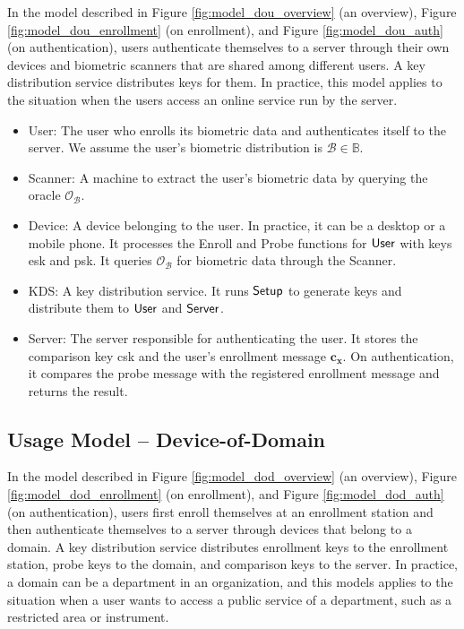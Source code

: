 In the model described in Figure \ref{fig:model_dou_overview} (an overview), Figure \ref{fig:model_dou_enrollment} (on enrollment), and Figure \ref{fig:model_dou_auth} (on authentication), users authenticate themselves to a server through their own devices and biometric scanners that are shared among different users.
A key distribution service distributes keys for them. In practice, this model applies to the situation when the users access an online service run by the server.

\begin{itemize}

	\item {\sf User}: The user who enrolls its biometric data and authenticates itself to the server. We assume the user's biometric distribution is $\mathcal{B} \in \mathbb{B}$. 

	\item {\sf Scanner}: A machine to extract the user's biometric data by querying the oracle $\mathcal{O}_{\mathcal{B}}$.
	
	\item {\sf Device}: A device belonging to the user. In practice, it can be a desktop or a mobile phone. It processes the {\sf Enroll} and {\sf Probe} functions for ${\sf User}$ with keys {\sf esk} and {\sf psk}. It queries $\mathcal{O}_{\mathcal{B}}$ for biometric data through the {\sf Scanner}.
	
	\item {\sf KDS}: A key distribution service. It runs ${\sf Setup}$ to generate keys and distribute them to ${\sf User}$ and ${\sf Server}$.
		
	\item {\sf Server}: The server responsible for authenticating the user. It stores the comparison key {\sf csk} and the user's enrollment message $\mathbf{c_x}$. On authentication, it compares the probe message with the registered enrollment message and returns the result.  

\end{itemize}




\pagebreak

\subsection{Usage Model – Device-of-Domain}
\label{sec:dod_model}

In the model described in Figure \ref{fig:model_dod_overview} (an overview), Figure \ref{fig:model_dod_enrollment} (on enrollment), and Figure \ref{fig:model_dod_auth} (on authentication), users first enroll themselves at an enrollment station and then authenticate themselves to a server through devices that belong to a domain.
A key distribution service distributes enrollment keys to the enrollment station, probe keys to the domain, and comparison keys to the server. In practice, a domain can be a department in an organization, and this models applies to the situation when a user wants to access a public service of a department, such as a restricted area or instrument. 

